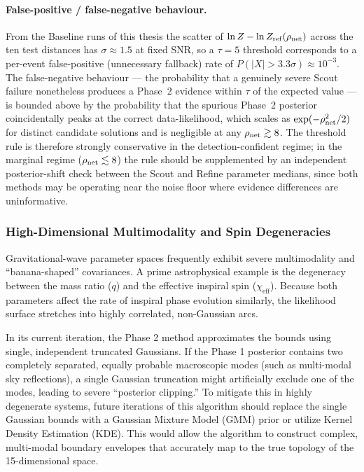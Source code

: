 \documentclass[12pt]{article}
\begin{document}
\paragraph{False-positive / false-negative behaviour.}
From the Baseline runs of this thesis the scatter of $\ln Z - \ln Z_{\rm ref}(\rho_{\rm net})$ across the ten test distances has $\sigma \approx 1.5$ at fixed SNR, so a $\tau = 5$ threshold corresponds to a per-event false-positive (unnecessary fallback) rate of $P(|X| > 3.3\sigma) \approx 10^{-3}$. The false-negative behaviour --- the probability that a genuinely severe Scout failure nonetheless produces a Phase~2 evidence within $\tau$ of the expected value --- is bounded above by the probability that the spurious Phase~2 posterior coincidentally peaks at the correct data-likelihood, which scales as $\exp(-\rho_{\rm net}^2/2)$ for distinct candidate solutions and is negligible at any $\rho_{\rm net} \gtrsim 8$. The threshold rule is therefore strongly conservative in the detection-confident regime; in the marginal regime ($\rho_{\rm net} \lesssim 8$) the rule should be supplemented by an independent posterior-shift check between the Scout and Refine parameter medians, since both methods may be operating near the noise floor where evidence differences are uninformative.

\subsubsection{High-Dimensional Multimodality and Spin Degeneracies}
Gravitational-wave parameter spaces frequently exhibit severe multimodality and ``banana-shaped'' covariances. A prime astrophysical example is the degeneracy between the mass ratio ($q$) and the effective inspiral spin ($\chi_{\text{eff}}$). Because both parameters affect the rate of inspiral phase evolution similarly, the likelihood surface stretches into highly correlated, non-Gaussian arcs.

In its current iteration, the Phase 2 method approximates the bounds using single, independent truncated Gaussians. If the Phase 1 posterior contains two completely separated, equally probable macroscopic modes (such as multi-modal sky reflections), a single Gaussian truncation might artificially exclude one of the modes, leading to severe ``posterior clipping.'' To mitigate this in highly degenerate systems, future iterations of this algorithm should replace the single Gaussian bounds with a Gaussian Mixture Model (GMM) prior or utilize Kernel Density Estimation (KDE). This would allow the algorithm to construct complex, multi-modal boundary envelopes that accurately map to the true topology of the 15-dimensional space.
\end{document}
